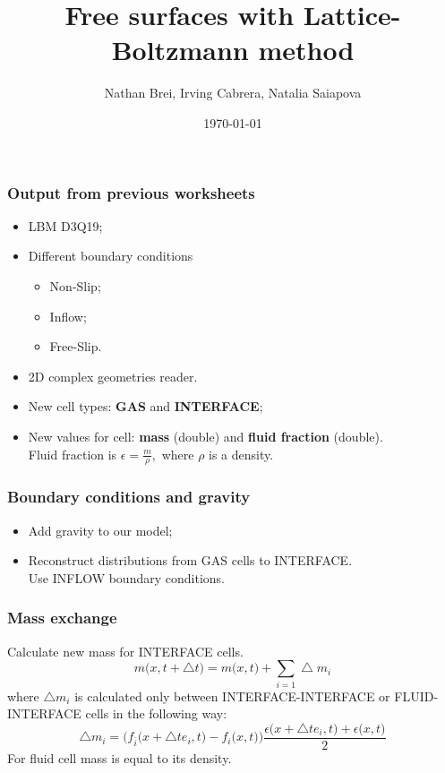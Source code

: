 \documentclass[10pt,a4paper]{beamer}
\author{ Nathan Brei, Irving Cabrera, Natalia Saiapova}
\institute[TUM]{TU München}
\date{\today}
\title{Free surfaces with Lattice-Boltzmann method}
\begin{document}
\begin{frame}
	\maketitle
\end{frame}
\begin{frame}
	\frametitle{Output from previous worksheets}
	\begin{itemize}
	\item LBM D3Q19;
	\item Different boundary conditions
		\begin{itemize}
		\item Non-Slip;  
		\item Inflow;
		\item Free-Slip.
		\end{itemize}
	\item 2D complex geometries reader.
	\end{itemize}
\end{frame}

\begin{frame}
  \begin{itemize}
    \frametitle{New values}
  \item New cell types: \textbf{GAS} and \textbf{INTERFACE};
  \item New values for cell: \textbf{mass} (double) and \textbf{fluid fraction} (double).\\
    Fluid fraction is
    \(
    \epsilon = \frac{m}{\rho},
    \)
    where $\rho$ is a density.
  \end{itemize}
\end{frame}
\begin{frame}
  \frametitle{Boundary conditions and gravity}
  \begin{itemize}
  \item Add gravity to our model;
  \item Reconstruct distributions from GAS cells to INTERFACE.\\
    Use INFLOW boundary conditions.
  \end{itemize}
\end{frame}

\begin{frame}
  \frametitle{Mass exchange}
  Calculate new mass for INTERFACE cells.
    \begin{equation}
      m\big(x, t+\bigtriangleup t\big) = m\big(x,t\big)+\sum_{i=1}\bigtriangleup m_i
    \end{equation}
    where $\bigtriangleup m_i$ is calculated only between INTERFACE-INTERFACE or
    FLUID-INTERFACE cells in the following way:
    \begin{equation}
      \bigtriangleup m_i = \Big(f_{\bar{i}}\big(x+\bigtriangleup te_i,t\big)-f_i\big(x,t\big)\Big)\frac{\epsilon\big(x+\bigtriangleup te_i,t\big)+\epsilon\big(x,t\big)}{2}
    \end{equation}
    For fluid cell mass is equal to its density.
\end{frame}
\end{document}
